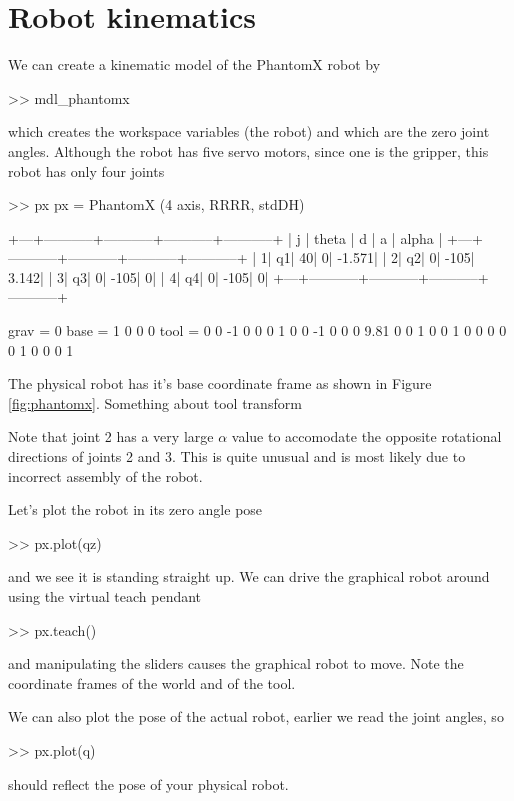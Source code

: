\documentclass[11pt]{article}
\begin{document}
\section{Robot kinematics}
We can create a kinematic model of the PhantomX robot by
\begin{Code}
>> mdl_phantomx
\end{Code}
which creates the workspace variables  (the robot) and  which are the zero joint angles.
Although the robot has five servo motors, since one is the gripper, this robot has only four joints
\begin{Code}
>> px
px = 
PhantomX (4 axis, RRRR, stdDH)                       
                                                     
+---+-----------+-----------+-----------+-----------+
| j |     theta |         d |         a |     alpha |
+---+-----------+-----------+-----------+-----------+
|  1|         q1|         40|          0|     -1.571|
|  2|         q2|          0|       -105|      3.142|
|  3|         q3|          0|       -105|          0|
|  4|         q4|          0|       -105|          0|
+---+-----------+-----------+-----------+-----------+
                                                     
grav =    0  base = 1  0  0  0   tool =   0  0 -1  0 
          0         0  1  0  0           -1  0  0  0 
       9.81         0  0  1  0            0  1  0  0 
                    0  0  0  1            0  0  0  1
\end{Code}
The physical robot has it's base coordinate frame as shown in Figure \ref{fig:phantomx}.
Something about tool transform

Note that joint 2 has a very large $\alpha$ value to accomodate the opposite rotational directions of joints 2 and 3.
This is quite unusual and is most likely due to incorrect assembly of the robot.

Let's plot the robot in its zero angle pose
\begin{Code}
>> px.plot(qz)
\end{Code}
and we see it is standing straight up.
We can drive the graphical robot around using the virtual teach pendant
\begin{Code}
>> px.teach()
\end{Code}
and manipulating the sliders causes the graphical robot to move.  Note the coordinate frames of the world and 
of the tool.

We can also plot the pose of the actual robot, earlier we read the joint angles, so
\begin{Code}
>> px.plot(q)
\end{Code}
should reflect the pose of your physical robot.
\end{document}
